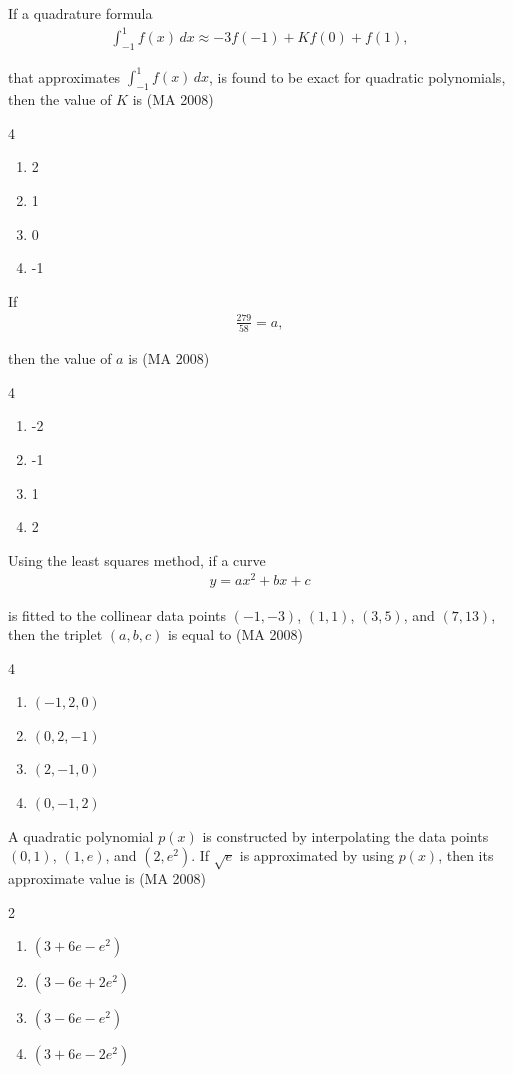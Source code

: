 \item
If a quadrature formula 
\begin{align}
    \int_{-1}^1 f(x) \, dx \approx -3 f(-1) + K f(0) + f(1),
\end{align}

that approximates $\int_{-1}^1 f(x) \, dx$, is found to be exact for quadratic polynomials, then the value of $K$ is
\hfill (MA 2008)
\begin{multicols}{4}
\begin{enumerate}
    \item 2
    \item 1
    \item 0
    \item -1
\end{enumerate}
\end{multicols}

\item
If
\begin{align}
    \frac{279}{58} = a,
\end{align}

then the value of $a$ is
\hfill (MA 2008)
\begin{multicols}{4}
\begin{enumerate}
    \item -2
    \item -1
    \item 1
    \item 2
\end{enumerate}
\end{multicols}

\item
Using the least squares method, if a curve 
\begin{align}
    y = a x^2 + b x + c
\end{align}

is fitted to the collinear data points $(-1,-3)$, $(1,1)$, $(3,5)$, and $(7,13)$, then the triplet $(a,b,c)$ is equal to
\hfill (MA 2008)
\begin{multicols}{4}
\begin{enumerate}
    \item $(-1, 2, 0)$
    \item $(0, 2, -1)$
    \item $(2, -1, 0)$
    \item $(0, -1, 2)$
\end{enumerate}
\end{multicols}

\item
A quadratic polynomial $p(x)$ is constructed by interpolating the data points $(0,1)$, $(1,e)$, and $(2,e^2)$. If $\sqrt{e}$ is approximated by using $p(x)$, then its approximate value is
\hfill (MA 2008)
\begin{multicols}{2}
\begin{enumerate}
    \item $(3 + 6 e - e^2)$
    \item $(3 - 6 e + 2 e^2)$
    \item $(3 - 6 e - e^2)$
    \item $(3 + 6 e - 2 e^2)$
\end{enumerate}
\end{multicols}

